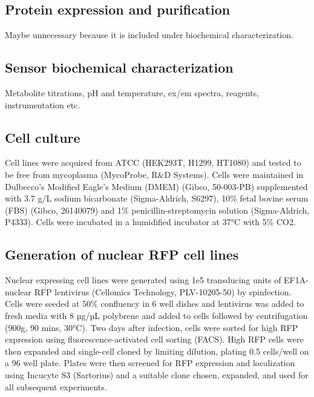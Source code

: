 \documentclass[9pt,lineno]{elife}
\begin{document}
\subsection{Protein expression and purification}
Maybe unnecessary because it is included under biochemical characterization.


\subsection{Sensor biochemical characterization}
Metabolite titrations, pH and temperature, ex/em spectra, reagents, instrumentation etc.





\subsection{Cell culture}
Cell lines were acquired from ATCC (HEK293T, H1299, HT1080) and tested to be free from mycoplasma (MycoProbe, R\&D Systems).
Cells were maintained in Dulbecco’s Modified Eagle’s Medium (DMEM) (Gibco, 50-003-PB) supplemented with 3.7 g/L sodium bicarbonate (Sigma-Aldrich, S6297), 10\% fetal bovine serum (FBS) (Gibco, 26140079) and 1\% penicillin-streptomycin solution (Sigma-Aldrich, P4333).
Cells were incubated in a humidified incubator at 37°C with 5\% CO2.

\subsection{Generation of nuclear RFP cell lines}
Nuclear expressing cell lines were generated using 1e5 transducing units of EF1A-nuclear RFP lentivirus (Cellomics Technology, PLV-10205-50) by spinfection.
Cells were seeded at 50\% confluency in 6 well dishes and lentivirus was added to fresh media with 8 µg/µL polybrene and added to cells followed by centrifugation (900g, 90 mins, 30°C).
Two days after infection, cells were sorted for high RFP expression using fluorescence-activated cell sorting (FACS).
High RFP cells were then expanded and single-cell cloned by limiting dilution, plating 0.5 cells/well on a 96 well plate.
Plates were then screened for RFP expression and localization using Incucyte S3 (Sartorius) and a suitable clone chosen, expanded, and used for all subsequent experiments.
\end{document}
